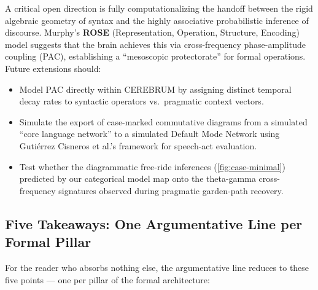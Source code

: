 \documentclass[
]{article}
\providecommand{\tightlist}{%
  \setlength{\itemsep}{0pt}\setlength{\parskip}{0pt}}
\begin{document}
A critical open direction is fully computationalizing the handoff
between the rigid algebraic geometry of syntax and the highly
associative probabilistic inference of discourse. Murphy's \textbf{ROSE}
(Representation, Operation, Structure, Encoding) model
\citep{murphy2023rose} suggests that the brain achieves this via
cross-frequency phase-amplitude coupling (PAC), establishing a
``mesoscopic protectorate'' for formal operations. Future extensions
should:

\begin{itemize}
\tightlist
\item
  Model PAC directly within CEREBRUM by assigning distinct temporal
  decay rates to syntactic operators vs.~pragmatic context vectors.
\item
  Simulate the export of case-marked commutative diagrams from a
  simulated ``core language network'' to a simulated Default Mode
  Network using Gutiérrez Cisneros et al.'s
  \citeyearpar{gutierrez2026neuropragmatics} framework for speech-act
  evaluation.
\item
  Test whether the diagrammatic free-ride inferences
  (\autoref{fig:case-minimal}) predicted by our categorical model map
  onto the theta-gamma cross-frequency signatures observed during
  pragmatic garden-path recovery.
\end{itemize}

\subsection{Five Takeaways: One Argumentative Line per Formal
Pillar}\label{five-takeaways-one-argumentative-line-per-formal-pillar}

For the reader who absorbs nothing else, the argumentative line reduces
to these five points --- one per pillar of the formal architecture:
\end{document}
